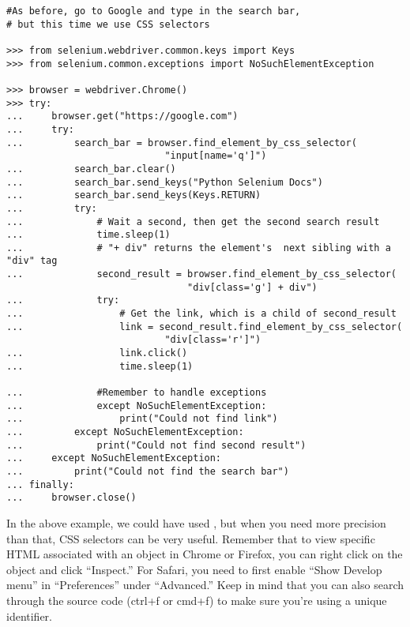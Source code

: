 \begin{lstlisting}
#As before, go to Google and type in the search bar,
# but this time we use CSS selectors

>>> from selenium.webdriver.common.keys import Keys
>>> from selenium.common.exceptions import NoSuchElementException

>>> browser = webdriver.Chrome()
>>> try:
...		browser.get("https://google.com")
...		try:
...			search_bar = browser.find_element_by_css_selector(
							"input[name='q']")
...			search_bar.clear()
...			search_bar.send_keys("Python Selenium Docs")
...			search_bar.send_keys(Keys.RETURN)
...			try:
...				# Wait a second, then get the second search result
...				time.sleep(1)
...				# "+ div" returns the element's  next sibling with a "div" tag
...				second_result = browser.find_element_by_css_selector(
								"div[class='g'] + div")
...				try:
...					# Get the link, which is a child of second_result
...					link = second_result.find_element_by_css_selector(
							"div[class='r']")
...					link.click()
...					time.sleep(1)

...				#Remember to handle exceptions
...				except NoSuchElementException:
...					print("Could not find link")
...			except NoSuchElementException:
...				print("Could not find second result")
...		except NoSuchElementException:
...			print("Could not find the search bar")
...	finally:
...		browser.close()

\end{lstlisting}

In the above example, we could have used , but when you need more precision than that, CSS selectors can be very useful.
Remember that to view specific HTML associated with an object in Chrome or Firefox, you can right click on the object and click ``Inspect.''
For Safari, you need to first enable ``Show Develop menu'' in ``Preferences'' under ``Advanced.''
Keep in mind that you can also search through the source code (ctrl+f or cmd+f) to make sure you're using a unique identifier.

